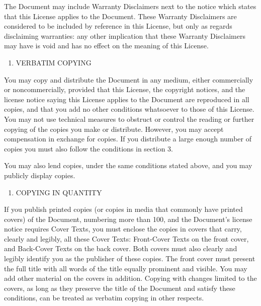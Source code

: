 \documentclass[12pt,a4paperpaper,]{report}
\providecommand{\tightlist}{%
  \setlength{\itemsep}{0pt}\setlength{\parskip}{0pt}}
\begin{document}
The Document may include Warranty Disclaimers next to the notice which
states that this License applies to the Document. These Warranty
Disclaimers are considered to be included by reference in this License,
but only as regards disclaiming warranties: any other implication that
these Warranty Disclaimers may have is void and has no effect on the
meaning of this License.

\begin{enumerate}
\def\labelenumi{\arabic{enumi}.}
\setcounter{enumi}{1}
\tightlist
\item
  VERBATIM COPYING
\end{enumerate}

You may copy and distribute the Document in any medium, either
commercially or noncommercially, provided that this License, the
copyright notices, and the license notice saying this License applies to
the Document are reproduced in all copies, and that you add no other
conditions whatsoever to those of this License. You may not use
technical measures to obstruct or control the reading or further copying
of the copies you make or distribute. However, you may accept
compensation in exchange for copies. If you distribute a large enough
number of copies you must also follow the conditions in section 3.

You may also lend copies, under the same conditions stated above, and
you may publicly display copies.

\begin{enumerate}
\def\labelenumi{\arabic{enumi}.}
\setcounter{enumi}{2}
\tightlist
\item
  COPYING IN QUANTITY
\end{enumerate}

If you publish printed copies (or copies in media that commonly have
printed covers) of the Document, numbering more than 100, and the
Document's license notice requires Cover Texts, you must enclose the
copies in covers that carry, clearly and legibly, all these Cover Texts:
Front-Cover Texts on the front cover, and Back-Cover Texts on the back
cover. Both covers must also clearly and legibly identify you as the
publisher of these copies. The front cover must present the full title
with all words of the title equally prominent and visible. You may add
other material on the covers in addition. Copying with changes limited
to the covers, as long as they preserve the title of the Document and
satisfy these conditions, can be treated as verbatim copying in other
respects.
\end{document}
